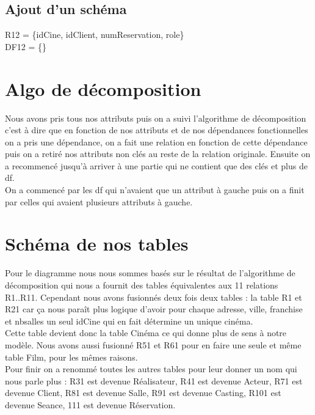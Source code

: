 \documentclass[a4paper,sffamily,12pt]{article}
\begin{document}
				\vspace{0.5cm}
								
			\subsection{Ajout d'un schéma} 	

				\vspace{0.5cm}
											
				\noindent R12 = \{idCine, idClient, numReservation, role\} \\ DF12 = \{\} \\

				\vspace{0.5cm}

		\section{Algo de décomposition}

			\vspace{0.5cm}
			
			Nous avons pris tous nos attributs puis on a suivi l'algorithme de décomposition c'est à dire que en fonction de nos attributs et de nos dépendances fonctionnelles on a pris une dépendance, on a fait une relation en fonction de cette dépendance puis on a retiré nos attributs non clés au reste de la relation originale. Ensuite on a recommencé jusqu'à arriver à une partie qui ne contient que des clés et plus de df.\\
			\indent On a commencé par les df qui n'avaient que un attribut à gauche puis on a finit par celles qui avaient plusieurs attributs à gauche.
		
			



			\vspace{0.5cm}

		\section{Schéma de nos tables}
		
		Pour le diagramme nous nous sommes basés sur le résultat de l'algorithme de décomposition qui nous a fournit des tables équivalentes aux 11 relations R1..R11. Cependant nous avons fusionnés deux fois deux tables : la table R1 et R21 car ça nous paraît plus logique d'avoir pour chaque adresse, ville, franchise et nbsalles un seul idCine qui en fait détermine un unique cinéma.\\
		\indent Cette table devient donc la table Cinéma ce qui donne plus de sens à notre modèle. Nous avons aussi fusionné R51 et R61 pour en faire une seule et même table Film, pour les mêmes raisons.\\
		\indent Pour finir on a renommé toutes les autres tables pour leur donner un nom qui nous parle plus : R31 est devenue Réalisateur, R41 est devenue Acteur, R71 est devenue Client, R81 est devenue Salle, R91 est devenue Casting, R101 est devenue Seance, 111 est devenue Réservation.
\end{document}
